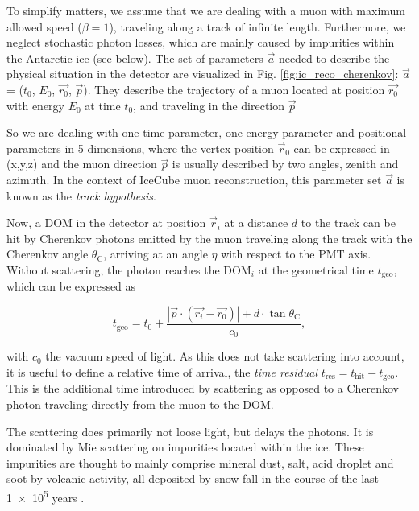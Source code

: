 \documentclass[
    a4paper, %
    fontsize=10pt, %
    twoside=false, %
    numbers=noenddot, %
    fontmethod=tex,
]{kaobook}
\begin{document}
To simplify matters, we assume that we are dealing with a muon with maximum allowed speed ($\beta=1$), traveling along a track of infinite length. Furthermore, we neglect stochastic photon losses, which are mainly caused by impurities within the Antarctic ice (see below). The set of parameters $\vec{a}$ needed to describe the physical situation in the detector are visualized in Fig. \ref{fig:ic_reco_cherenkov}: $\vec{a}$ = ($t_0$, $E_0$, $\vec{r_0}$, $\vec{p}$). They describe the trajectory of a muon located at position $\vec{r_0}$ with energy $E_0$ at time $t_0$, and traveling in the direction $\vec{p}$

So we are dealing with one time parameter, one energy parameter and positional parameters in 5 dimensions, where the vertex position $\vec{r}_0$ can be expressed in (x,y,z) and the muon direction $\vec{p}$ is usually described by two angles, zenith and azimuth. In the context of IceCube muon reconstruction, this parameter set $\vec{a}$ is known as the \textit{track hypothesis}.

Now, a DOM in the detector at position $\vec{r}_i$ at a distance $d$ to the track can be hit by Cherenkov photons emitted by the muon traveling along the track with the Cherenkov angle $\theta_\text{C}$, arriving at an angle $\eta$ with respect to the PMT axis. Without scattering, the photon reaches the $\text{DOM}_i$ at the geometrical time $t_\text{geo}$, which can be expressed as

\begin{equation}
t_\text{geo} = t_0 + \frac{|\vec{p}\cdot(\vec{r_i}-\vec{r_0})|+d\cdot \tan{\theta_\text{C}}}{c_0},
\end{equation}

with $c_0$ the vacuum speed of light. As this does not take scattering into account, it is useful to define a relative time of arrival, the \textit{time residual} $t_\text{res} = t_\text{hit} - t_\text{geo}$. This is the additional time introduced by scattering as opposed to a Cherenkov photon traveling directly from the muon to the DOM.

The scattering does primarily not loose light, but delays the photons. It is dominated by Mie scattering on impurities located within the ice. These impurities are thought to mainly comprise mineral dust, salt, acid droplet and soot by volcanic activity, all deposited by snow fall in the course of the last \num{1e5} years .
\end{document}
